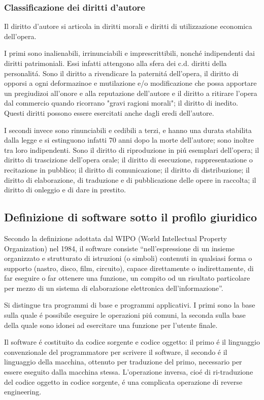 \documentclass{article}
\begin{document}
\subsubsection{Classificazione dei diritti d'autore}
Il diritto d'autore si articola in diritti morali e diritti di utilizzazione economica dell'opera. 

I primi sono inalienabili, irrinunciabili e imprescrittibili, nonch\'e indipendenti dai diritti patrimoniali. Essi infatti attengono alla sfera dei c.d. diritti della personalit\'a. Sono il diritto a rivendicare la paternit\'a dell'opera, il diritto di opporsi a ogni deformazinoe e mutilazione e/o modificazione che possa apportare un pregiudizoi all'onore e alla reputazione dell'autore e il diritto a ritirare l'opera dal commercio quando ricorrano "gravi ragioni morali"; il diritto di inedito. Questi diritti possono essere esercitati anche dagli eredi dell'autore.

I secondi invece sono rinunciabili e cedibili a terzi, e hanno una durata stabilita dalla legge e si estinguono infatti 70 anni dopo la morte dell'autore; sono inoltre tra loro indipendenti. Sono il diritto di riproduzione in pi\'u esemplari dell'opera; il diritto di trascizione dell'opera orale; il diritto di esecuzione, rappresentazione o recitazione in pubblico; il diritto di comunicazione; il diritto di distribuzione; il diritto di elaborazione, di traduzione e di pubblicazione delle opere in raccolta; il diritto di onleggio e di dare in prestito.

\subsection{Definizione di software sotto il profilo giuridico}
Secondo la definizione adottata dal WIPO (World Intellectual Property Organization) nel 1984, il software consiste “nell’espressione di un insieme organizzato e strutturato di istruzioni (o simboli) contenuti in qualsiasi forma o supporto (nastro, disco, film, circuito), capace direttamente o indirettamente, di far eseguire o far ottenere una funzione, un compito od un risultato particolare per mezzo di un sistema di elaborazione elettronica dell’informazione”.

Si distingue tra programmi di base e programmi applicativi. I primi sono la base sulla quale \'e possibile eseguire le operazioni pi\'u comuni, la seconda sulla base della quale sono idonei ad esercitare una funzione per l'utente finale.

Il software \'e costituito da codice sorgente e codice oggetto: il primo \'e il linguaggio convenzionale del programmatore per scrivere il software, il secondo \'e il linguaggio della macchina, ottenuto per traduzione del primo, necessario per essere eseguito dalla macchina stessa. L'operazione inversa, cio\'e di ri-traduzione del codice oggetto in codice sorgente, \'e una complicata operazione di reverse engineering. 
\end{document}
